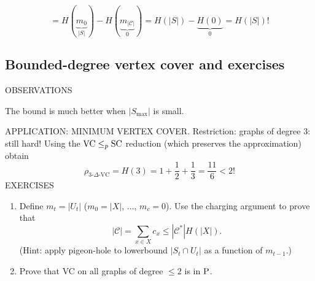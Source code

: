\[=H(\underbrace{m_0}_{|S|})-H(\underbrace{m_{|\mathcal C|}}_0)
=H(|S|)-\underbrace{H(0)}_0=H(|S|)!\]
\subsection{Bounded-degree vertex cover and exercises}
OBSERVATIONS

The bound is much better when $|S_{\max}|$ is small.

APPLICATION: MINIMUM VERTEX COVER.
Restriction: graphs of degree 3: still hard!
Using the $\mathrm{VC}\leq_p\mathrm{SC}$ reduction (which preserves the approximation) obtain
\[\rho_{3\text{-}\Delta\text{-VC}}=H(3)=1+\frac12+\frac13=\frac{11}{6}<2!\]
EXERCISES
\begin{enumerate}
\item Define $m_t=|U_t|$ ($m_0=|X|$, $\ldots$, $m_c=0$). Use the charging argument to prove that
\[|\mathcal C|=\sum_{x\in X}c_x\leq|\mathcal C^*|H(|X|).\]
(Hint: apply pigeon-hole to lowerbound $|S_t\cap U_t|$ as a function of $m_{t-1}$.)
\item Prove that VC on all graphs of degree $\leq2$ is in $\mathrm{P}$.
\end{enumerate}
